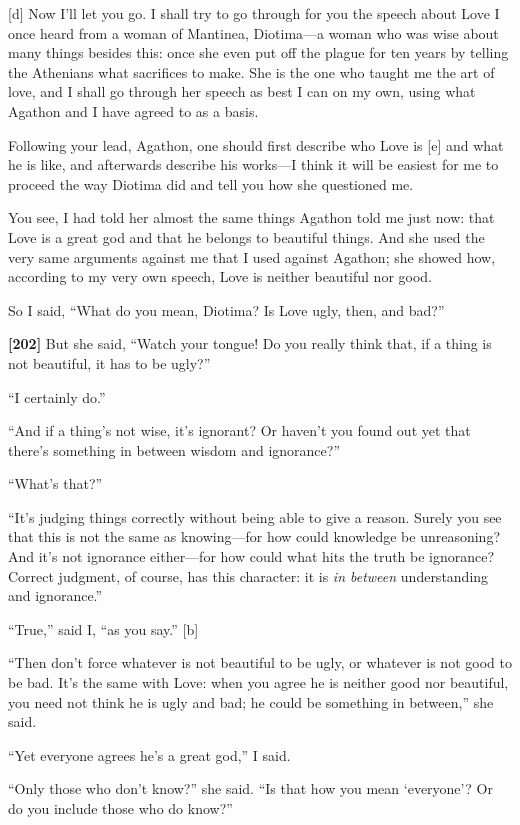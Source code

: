{[}d{]} Now I'll let you go. I shall try to go through for you the
speech about Love I once heard from a woman of Mantinea, Diotima---a
woman who was wise about many things besides this: once she even put off
the plague for ten years by telling the Athenians what sacrifices to
make. She is the one who taught me the art of love, and I shall go
through her speech as best I can on my own, using what Agathon and I
have agreed to as a basis.

Following your lead, Agathon, one should first describe who Love is
{[}e{]} and what he is like, and afterwards describe his works---I think
it will be easiest for me to proceed the way Diotima did and tell you
how she questioned me.

You see, I had told her almost the same things Agathon told me just now:
that Love is a great god and that he belongs to beautiful
things. And she used
the very same arguments against me that I used against Agathon; she
showed how, according to my very own speech, Love is neither beautiful
nor good.

So I said, “What do you mean, Diotima? Is Love ugly, then, and bad?”

{\bf {[}202{]}} But she said, “Watch your tongue! Do you really think
that, if a thing is not beautiful, it has to be ugly?”

“I certainly do.”

“And if a thing's not wise, it's ignorant? Or haven't you found out yet
that there's something in between wisdom and ignorance?”

“What's that?”

“It's judging things correctly without being able to give a reason.
Surely you see that this is not the same as knowing---for how could
knowledge be unreasoning? And it's not ignorance either---for how could
what hits the truth be ignorance? Correct judgment, of course, has this
character: it is {\em in between} understanding and ignorance.”

“True,” said I, “as you say.” {[}b{]}

“Then don't force whatever is not beautiful to be ugly, or whatever is
not good to be bad. It's the same with Love: when you agree he is
neither good nor beautiful, you need not think he is ugly and bad; he
could be something in between,” she said.

“Yet everyone agrees he's a great god,” I said.

“Only those who don't know?” she said. “Is that how you mean ‘everyone'?
Or do you include those who do know?”

